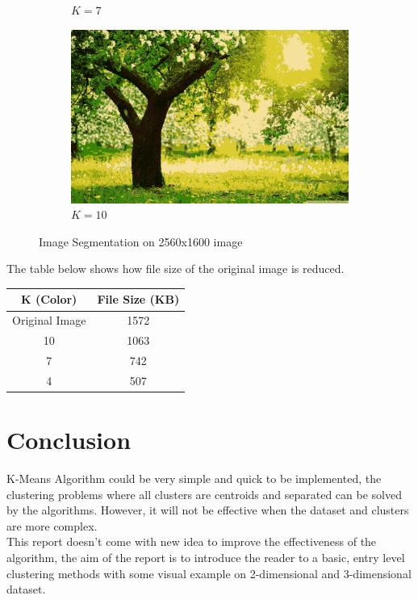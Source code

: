 \documentclass[conference]{IEEEtran}
\begin{document}
\begin{figure}[H]
\begin{subfigure}[b]{0.23\textwidth}
        \caption{$K=7$}
        \label{fig:7Color}
    \end{subfigure}
    \quad
    \begin{subfigure}[b]{0.23\textwidth}
        \includegraphics[width=\textwidth]{10Color}
        \caption{$K=10$}
        \label{fig:10COlor}
    \end{subfigure}
    \caption{Image Segmentation on 2560x1600 image}        
\end{figure}
\indent
The table below shows how file size of the original image is reduced.
\begin{center}
 \begin{tabular}{||c c||} 
 \hline
 K (Color) & File Size (KB) \\ [0.5ex] 
 \hline\hline
 Original Image & 1572  \\ 
 \hline
 10 & 1063 \\
 \hline
 7 & 742 \\
 \hline
 4 & 507  \\[1ex] 
 \hline
\end{tabular}
\end{center}
\section{Conclusion}
\indent
K-Means Algorithm could be very simple and quick to be implemented, the clustering problems where all clusters are centroids and separated can be solved by the algorithms. However, it will not be effective when the dataset and clusters are more complex.\\
\indent 
This report doesn't come with new idea to improve the effectiveness of the algorithm, the aim of the report is to introduce the reader to a basic, entry level clustering methods with some visual example on 2-dimensional and 3-dimensional dataset.
\end{document}
